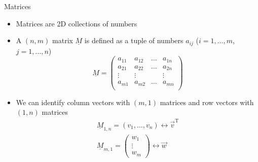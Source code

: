   \begin{frame}{Matrices}
    \begin{itemize}
      \item Matrices are 2D collections of numbers
      \item A $(n, m)$ matrix $\underline{M}$ is defined as a tuple of numbers
        $a_{ij}$ ($i=1,\dots,m$, $j=1,\dots,n$)
        \begin{equation*}
          \underline{M} =
          \begin{pmatrix}
            a_{11} & a_{12} & \dots & a_{1n} \\
            a_{21} & a_{22} & \dots & a_{2n} \\
            \vdots & \vdots & & \vdots \\
            a_{m1} & a_{m2} & \dots & a_{mn} \\
          \end{pmatrix}
        \end{equation*}
      \item We can identify column vectors with $(m, 1)$ matrices and row
        vectors with $(1, n)$ matrices
        \begin{gather*}
          \underline{M}_{1,n} = \left(v_1, \dots, v_n\right)
            \leftrightarrow \vec{v}^\mathrm{T} \\
          \underline{M}_{m, 1} =
            \begin{pmatrix}w_1 \\ \vdots \\ w_m \end{pmatrix}
            \leftrightarrow \vec{w}
        \end{gather*}
    \end{itemize}
  \end{frame}

